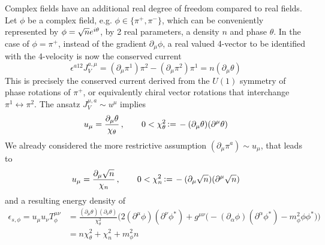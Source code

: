 Complex fields have an additional real degree of freedom compared to real fields. Let $\phi$ be a complex field, e.g. $\phi\in\{\pi^+,\pi^-\}$, which can be conveniently represented by ${\phi=\sqrt{n}e^{{i}\theta}}$, by 2 real parameters, a density $n$ and phase $\theta$. In the case of ${\phi=\pi^+}$, instead of the gradient ${\partial_\mu\phi}$, a real valued 4-vector to be identified with the 4-velocity is now the conserved current
\begin{equation}
    \epsilon^{a12}J_V^{a,\mu}=(\partial_\mu\pi^1)\pi^2-(\partial_\mu\pi^2)\pi^1=n(\partial_\mu\theta)
\end{equation}
This is precisely the conserved current derived from the $U(1)$ symmetry of phase rotations of $\pi^+$, or equivalently chiral vector rotations that interchange ${\pi^1\leftrightarrow\pi^2}$. The ansatz $J_V^{\mu,a}\sim u^\mu$ implies
\begin{equation}
    u_\mu=\frac{\partial_\mu\theta}{\chi_\theta}\,,\qquad 0<\chi_\theta^2{\,\vcentcolon=\,}-(\partial_\mu\theta)(\partial^\mu\theta)
\end{equation}
We already considered the more restrictive assumption $(\partial_\mu\pi^a)\sim u_\mu$, that leads to 
\begin{equation}
    u_\mu=\frac{\partial_\mu\sqrt{n}}{\chi_n}\,,\qquad 0<\chi_n^2{\,\vcentcolon=\,}-(\partial_\mu\sqrt{n})(\partial^\mu\sqrt{n})
\end{equation}
and a resulting energy density of
\begin{subequations}
    \begin{align}
        \epsilon_{s,\phi}=u_\mu u_\nu T^{\mu\nu}_{\phi}&=\frac{(\partial_\mu\theta)(\partial_\nu\theta)}{\chi_\theta^2}\Big(2(\partial^\mu\phi)(\partial^\nu\phi^*)+g^{\mu\nu}\big(-(\partial_\alpha\phi)(\partial^\alpha\phi^*)-m_\phi^2\phi\phi^*\big)\Big)\\
        &=n\chi_\theta^2+\chi^2_n+m_\phi^2n
    \end{align}
\end{subequations}
